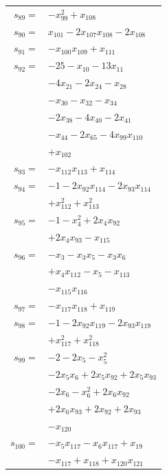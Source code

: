 \begin{longtable}{@{}r@{\;}l@{}}
\(s_{89}=\) & \(\displaystyle -x_{99}^{2} +x_{108}\) \\[3pt]
\(s_{90}=\) & \(\displaystyle x_{101} -2x_{107}x_{108} -2x_{108}\) \\[3pt]
\(s_{91}=\) & \(\displaystyle -x_{100}x_{109} +x_{111}\) \\[3pt]
\(s_{92}=\) & \(\displaystyle -25 -x_{10} -13x_{11}\) \\
 & \(\displaystyle -4x_{21} -2x_{24} -x_{28}\) \\
 & \(\displaystyle -x_{30} -x_{32} -x_{34}\) \\
 & \(\displaystyle -2x_{38} -4x_{40} -2x_{41}\) \\
 & \(\displaystyle -x_{44} -2x_{65} -4x_{99}x_{110}\) \\
 & \(\displaystyle +x_{102}\) \\[3pt]
\(s_{93}=\) & \(\displaystyle -x_{112}x_{113} +x_{114}\) \\[3pt]
\(s_{94}=\) & \(\displaystyle -1 -2x_{92}x_{114} -2x_{93}x_{114}\) \\
 & \(\displaystyle +x_{112}^{2} +x_{113}^{2}\) \\[3pt]
\(s_{95}=\) & \(\displaystyle -1 -x_{4}^{2} +2x_{4}x_{92}\) \\
 & \(\displaystyle +2x_{4}x_{93} -x_{115}\) \\[3pt]
\(s_{96}=\) & \(\displaystyle -x_{3} -x_{3}x_{5} -x_{3}x_{6}\) \\
 & \(\displaystyle +x_{4}x_{112} -x_{5} -x_{113}\) \\
 & \(\displaystyle -x_{115}x_{116}\) \\[3pt]
\(s_{97}=\) & \(\displaystyle -x_{117}x_{118} +x_{119}\) \\[3pt]
\(s_{98}=\) & \(\displaystyle -1 -2x_{92}x_{119} -2x_{93}x_{119}\) \\
 & \(\displaystyle +x_{117}^{2} +x_{118}^{2}\) \\[3pt]
\(s_{99}=\) & \(\displaystyle -2 -2x_{5} -x_{5}^{2}\) \\
 & \(\displaystyle -2x_{5}x_{6} +2x_{5}x_{92} +2x_{5}x_{93}\) \\
 & \(\displaystyle -2x_{6} -x_{6}^{2} +2x_{6}x_{92}\) \\
 & \(\displaystyle +2x_{6}x_{93} +2x_{92} +2x_{93}\) \\
 & \(\displaystyle -x_{120}\) \\[3pt]
\(s_{100}=\) & \(\displaystyle -x_{5}x_{117} -x_{6}x_{117} +x_{19}\) \\
 & \(\displaystyle -x_{117} +x_{118} +x_{120}x_{121}\) \\[3pt]

\end{longtable}
